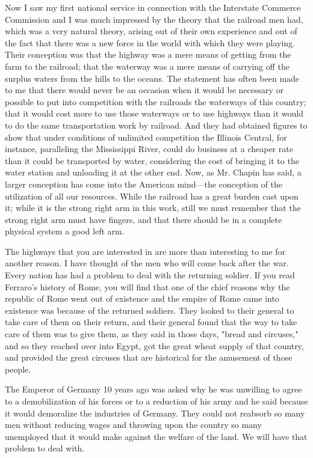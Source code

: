 \begin{linenumbers}
\indent Now I saw my first national service in connection with the Interstate Commerce Commission and I was much impressed by the theory that the railroad men had, which was a very natural theory, arising out of their own experience and out of the fact that there was a new force in the world with which they were playing. Their conception was that the highway was a mere means of getting from the farm to the railroad; that the waterway was a mere means of carrying off the surplus waters from the hills to the oceans. The statement has often been made to me that there would never be an occasion when it would be necessary or possible to put into competition with the railroads the waterways of this country; that it would cost more to use those waterways or to use highways than it would to do the same transportation work by railroad. And they had obtained figures to show that under conditions of unlimited competition the Illinois Central, for instance, paralleling the Mississippi River, could do business at a cheaper rate than it could be transported by water, considering the cost of bringing it to the water station and unloading it at the other end. Now, as Mr. Chapin has said, a larger conception has come into the American mind—the conception of the utilization of all our resources. While the railroad has a great burden cast upon it; while it is the strong right arm in this work, still we must remember that the strong right arm must have fingers, and that there should be in a complete physical system a good left arm.

\indent The highways that you are interested in are more than interesting to me for another reason. I have thought of the men who will come back after the war. Every nation has had a problem to deal with the returning soldier. If you read Ferraro's history of Rome, you will find that one of the chief reasons why the republic of Rome went out of existence and the empire of Rome came into existence was because of the returned soldiers. They looked to their general to take care of them on their return, and their general found that the way to take care of them was to give them, as they said in those days, "bread and circuses," and so they reached over into Egypt, got the great wheat supply of that country, and provided the great circuses that are historical for the amusement of those people.

\indent The Emperor of Germany 10 years ago was asked why he was unwilling to agree to a demobilization of his forces or to a reduction of his army and he said because it would demoralize the industries of Germany. They could not reabsorb so many men without reducing wages and throwing upon the country so many unemployed that it would make against the welfare of the land. We will have that problem to deal with.


\end{linenumbers}
